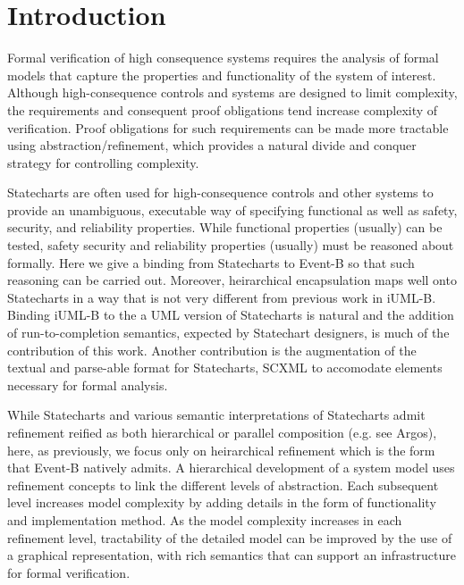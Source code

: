 
\section{Introduction}
\label{sec:introduction}

Formal verification of high consequence systems requires the analysis
of formal models that capture the properties and functionality of the
system of interest. Although high-consequence controls and systems are
designed to limit complexity, the requirements and consequent proof
obligations tend increase complexity of verification.  Proof
obligations for such requirements can be made more tractable using
abstraction/refinement, which provides a natural divide and conquer
strategy for controlling complexity.

Statecharts\cite{Harel} are often used for high-consequence controls
and other systems to provide an unambiguous, executable way of
specifying functional as well as safety, security, and reliability
properties.  While functional properties (usually) can be tested,
safety security and reliability properties (usually) must be reasoned
about formally.  Here we give a binding from Statecharts to Event-B so
that such reasoning can be carried out.  Moreover, heirarchical
encapsulation maps well onto Statecharts in a way that is not very
different from previous work in iUML-B\cite{snook14:_b_statem}.
Binding iUML-B to the a UML version of Statecharts is natural and the
addition of run-to-completion semantics, expected by Statechart
designers, is much of the contribution of this work.  Another
contribution is the augmentation of the textual and parse-able format
for Statecharts, SCXML to accomodate elements necessary for formal
analysis.  

While Statecharts and various semantic interpretations of Statecharts
admit refinement reified as both hierarchical or parallel composition
(e.g. see Argos\cite{Maraninchi91theargos}), here, as
previously\cite{snook14:_b_statem}, we focus only on heirarchical
refinement which is the form that Event-B natively admits.
  A hierarchical development of a system model uses refinement
concepts to link the different levels of abstraction. Each subsequent
level increases model complexity by adding details in the form of
functionality and implementation method. As the model complexity
increases in each refinement level, tractability of the detailed model
can be improved by the use of a graphical representation, with rich
semantics that can support an infrastructure for formal verification.

